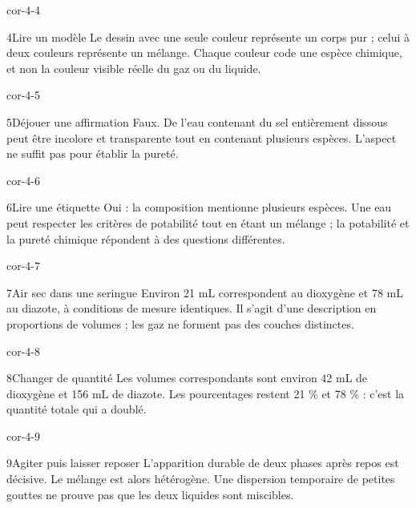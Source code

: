 \documentclass[12pt,twoside,openany]{book}
\begin{document}
\begin{blocLivre}{cor-4-4}
\begin{corrige}{4}{Lire un modèle}
Le dessin avec une seule couleur représente un corps pur ; celui à deux couleurs représente un mélange. Chaque couleur code une espèce chimique, et non la couleur visible réelle du gaz ou du liquide.\par
{}
\end{corrige}\end{blocLivre}
\begin{blocLivre}{cor-4-5}
\begin{corrige}{5}{Déjouer une affirmation}
Faux. De l’eau contenant du sel entièrement dissous peut être incolore et transparente tout en contenant plusieurs espèces. L’aspect ne suffit pas pour établir la pureté.\par
\end{corrige}\end{blocLivre}
\begin{blocLivre}{cor-4-6}
\begin{corrige}{6}{Lire une étiquette}
Oui : la composition mentionne plusieurs espèces. Une eau peut respecter les critères de potabilité tout en étant un mélange ; la potabilité et la pureté chimique répondent à des questions différentes.\par
\end{corrige}\end{blocLivre}
\begin{blocLivre}{cor-4-7}
\begin{corrige}{7}{Air sec dans une seringue}
Environ 21 mL correspondent au dioxygène et 78 mL au diazote, à conditions de mesure identiques. Il s’agit d’une description en proportions de volumes ; les gaz ne forment pas des couches distinctes.\par
\end{corrige}\end{blocLivre}
\begin{blocLivre}{cor-4-8}
\begin{corrige}{8}{Changer de quantité}
Les volumes correspondants sont environ 42 mL de dioxygène et 156 mL de diazote. Les pourcentages restent 21 \% et 78 \% : c’est la quantité totale qui a doublé.\par
\end{corrige}\end{blocLivre}
\begin{blocLivre}{cor-4-9}
\begin{corrige}{9}{Agiter puis laisser reposer}
L’apparition durable de deux phases après repos est décisive. Le mélange est alors hétérogène. Une dispersion temporaire de petites gouttes ne prouve pas que les deux liquides sont miscibles.\par
{}
\end{corrige}\end{blocLivre}
\end{document}
